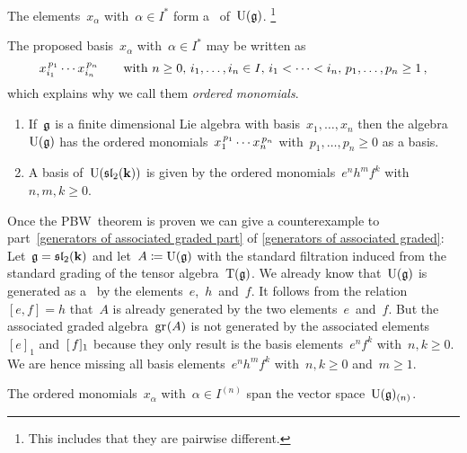 \begin{theorem}
  \label{pbw concrete}
  The elements~$x_\alpha$ with~$\alpha \in I^*$ form a~{\basis{$\kf$}} of~$\operatorname{U}(\mathfrak{g})$.%
  \footnote{This includes that they are pairwise different.}
\end{theorem}


\begin{remark}
  The proposed basis~$x_\alpha$ with~$\alpha \in I^*$ may be written as
  \[
    x_{i_1}^{\, p_1} \dotsm x_{i_n}^{\, p_n}
    \qquad
    \text{with~$n \geq 0$,~$i_1, \dotsc, i_n \in I$,~$i_1 < \dotsb < i_n$,~$p_1, \dotsc, p_n \geq 1$} \,,
  \]
  which explains why we call them \emph{ordered monomials}.
\end{remark}


\begin{example}
  \leavevmode
  \begin{enumerate}
    \item
      If~$\mathfrak{g}$ is a finite dimensional Lie algebra with basis~$x_1, \dotsc, x_n$ then the algebra~$\operatorname{U}(\mathfrak{g})$ has the ordered monomials~$x_1^{\, p_1} \dotsm x_n^{\, p_n}$ with~$p_1, \dotsc, p_n \geq 0$ as a basis.
    \item
      A basis of~$\operatorname{U}(\mathfrak{sl}_2(\mathbf{k}))$ is given by the ordered monomials~$e^n h^m f^k$ with~$n, m, k \geq 0$.
  \end{enumerate}
\end{example}


\begin{example}
  Once the PBW~theorem is proven we can give a counterexample to part~\ref*{generators of associated graded part} of \cref{generators of associated graded}:
  Let~$\mathfrak{g} = \mathfrak{sl}_2(\mathbf{k})$ and let~$A \coloneqq \operatorname{U}(\mathfrak{g})$ with the standard filtration induced from the standard grading of the tensor algebra~$\operatorname{T}(\mathfrak{g})$.
  We already know that~$\operatorname{U}(\mathfrak{g})$ is generated as a~{\algebra{$\kf$}} by the elements~$e$,~$h$~and~$f$.
  It follows from the relation~$[e,f] = h$ that~$A$ is already generated by the two elements~$e$~and~$f$.
  But the associated graded algebra~$\gr(A)$ is not generated by the associated elements~$[e]_1$ and~$[\, f]_1$ because they only result is the basis elements~$e^n f^k$ with~$n, k \geq 0$.
  We are hence missing all basis elements~$e^n h^m f^k$ with~$n, k \geq 0$ and~$m \geq 1$.
\end{example}


\begin{lemma}
  \label{pbw concrete generating part filtered part}
  The ordered monomials~$x_\alpha$ with~$\alpha \in I^{(n)}$ span the vector space~$\operatorname{U}(\mathfrak{g})_{(n)}$.
\end{lemma}


